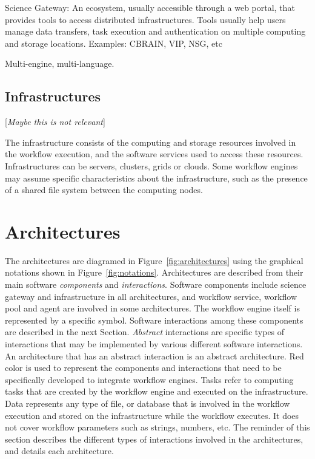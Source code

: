 \documentclass[preprint,3p,twocolumn]{elsarticle}
\newcommand{\todo}[1]{\color{blue}\xspace[\emph{#1}]\xspace\color{black}}
\begin{document}
Science Gateway: An ecosystem, usually accessible through a web
  portal, that provides tools to access distributed
  infrastructures. Tools usually help users manage data transfers,
  task execution and authentication on multiple computing and storage
  locations. Examples: CBRAIN, VIP, NSG, etc

Multi-engine, multi-language.


\subsection{Infrastructures}

\todo{Maybe this is not relevant}

The infrastructure consists of the computing and storage resources
involved in the workflow execution, and the software services used to
access these resources. Infrastructures can be servers, clusters,
grids or clouds. Some workflow engines may assume specific
characteristics about the infrastructure, such as the presence of a
shared file system between the computing nodes.

\section{Architectures}

The architectures are diagramed in Figure~\ref{fig:architectures}
using the graphical notations shown in
Figure~\ref{fig:notations}. Architectures are described from their
main software \emph{components} and \emph{interactions}. Software
components include science gateway and infrastructure in all
architectures, and workflow service, workflow pool and agent are
involved in some architectures. The workflow engine itself is
represented by a specific symbol. Software interactions among these
components are described in the next Section. \emph{Abstract}
interactions are specific types of interactions that may be
implemented by various different software interactions. An
architecture that has an abstract interaction is an abstract
architecture. Red color is used to represent the components and
interactions that need to be specifically developed to integrate
workflow engines. Tasks refer to computing tasks that are created by
the workflow engine and executed on the infrastructure. Data
represents any type of file, or database that is involved in the
workflow execution and stored on the infrastructure while the workflow
executes. It does not cover workflow parameters such as strings,
numbers, etc. The reminder of this section describes the different
types of interactions involved in the architectures, and details each
architecture.
\end{document}
